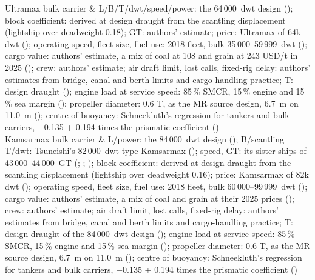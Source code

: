 Ultramax bulk carrier & L/B/T/dwt/speed/power: the 64\,000~dwt design (\citealp[Table 5]{man2022bulk}); block coefficient: derived at design draught from the scantling displacement (lightship over deadweight 0.18); GT: authors' estimate; price: Ultramax of 64k dwt (\citealp[pp. 7 and 16]{allied2026}); operating speed, fleet size, fuel use: 2018 fleet, bulk 35\,000--59\,999~dwt (\citealp[Table 35]{faber2020}); cargo value: authors' estimate, a mix of coal at 108 and grain at 243 USD/t in 2025 (\citealp{worldbank2026}); crew: authors' estimate; air draft limit, lost calls, fixed-rig delay: authors' estimates from bridge, canal and berth limits and cargo-handling practice; T: design draught (\citealp[Table 5]{man2022bulk}); engine load at service speed: 85\,\% SMCR, 15\,\% engine and 15\,\% sea margin (\citealp[Table 5]{man2022bulk}); propeller diameter: 0.6 T, as the MR source design, 6.7~m on 11.0~m (\citealp[Tables 1-2]{man2019mr}); centre of buoyancy: Schneekluth's regression for tankers and bulk carriers, \ensuremath{-}0.135 + 0.194 times the prismatic coefficient (\citealp[slide 16]{ventura_estimation}) \\
Kamsarmax bulk carrier & L/power: the 84\,000~dwt design (\citealp[Table 5]{man2022bulk}); B/scantling T/dwt: Tsuneishi's 82\,000~dwt type Kamsarmax (\citealp{tsuneishi_kamsarmax82}); speed, GT: its sister ships of 43\,000--44\,000~GT (\citealp{tsuneishi2015medimatsuura}; \citealp{tsuneishi2018launch}; \citealp{jsea2024sameij_tsuneishi}); block coefficient: derived at design draught from the scantling displacement (lightship over deadweight 0.16); price: Kamsarmax of 82k dwt (\citealp[pp. 7 and 16]{allied2026}); operating speed, fleet size, fuel use: 2018 fleet, bulk 60\,000--99\,999~dwt (\citealp[Table 35]{faber2020}); cargo value: authors' estimate, a mix of coal and grain at their 2025 prices (\citealp{worldbank2026}); crew: authors' estimate; air draft limit, lost calls, fixed-rig delay: authors' estimates from bridge, canal and berth limits and cargo-handling practice; T: design draught of the 84\,000~dwt design (\citealp[Table 5]{man2022bulk}); engine load at service speed: 85\,\% SMCR, 15\,\% engine and 15\,\% sea margin (\citealp[Table 5]{man2022bulk}); propeller diameter: 0.6 T, as the MR source design, 6.7~m on 11.0~m (\citealp[Tables 1-2]{man2019mr}); centre of buoyancy: Schneekluth's regression for tankers and bulk carriers, \ensuremath{-}0.135 + 0.194 times the prismatic coefficient (\citealp[slide 16]{ventura_estimation}) \\
